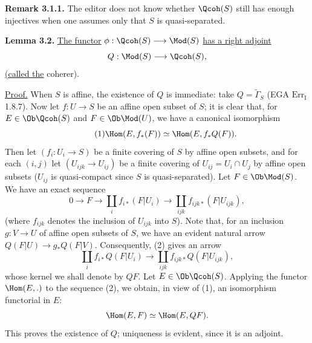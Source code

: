 \textbf{Remark 3.1.1.} The editor does not know whether $\Qcoh(S)$ still has enough injectives when one assumes only that $S$ is quasi-separated.

\textbf{Lemma 3.2.} \uline{The functor} $\phi:\Qcoh(S)\longrightarrow\Mod(S)$ \uline{has a right adjoint}
\[
 Q:\Mod(S)\longrightarrow\Qcoh(S),
\]
\uline{(called the} coherer).

\uline{Proof.} When $S$ is affine, the existence of $Q$ is immediate: take $Q=\widetilde{\Gamma}_S$ (EGA $\mathrm{Err}_{\mathrm I}$ 1.8.7). Now let $f:U\longrightarrow S$ be an affine open subset of $S$; it is clear that, for $E\in\Ob\Qcoh(S)$ and $F\in\Ob\Mod(U)$, we have a canonical isomorphism
\begin{equation}\tag{1}
 \Hom(E,f_*(F))\simeq \Hom(E,f_*Q(F)).
\end{equation}
Then let $(f_i:U_i\longrightarrow S)$ be a finite covering of $S$ by affine open subsets, and for each $(i,j)$ let $(U_{ijk}\longrightarrow U_{ij})$ be a finite covering of $U_{ij}=U_i\cap U_j$ by affine open subsets ($U_{ij}$ is quasi-compact since $S$ is quasi-separated). Let $F\in\Ob\Mod(S)$. We have an exact sequence
\begin{equation}\tag{2}
 0\longrightarrow F\longrightarrow \coprod_i f_{i*}(F|U_i)
 \longrightarrow \coprod_{ijk}f_{ijk*}(F|U_{ijk}),
\end{equation}
(where $f_{ijk}$ denotes the inclusion of $U_{ijk}$ into $S$). Note that, for an inclusion $g:V\longrightarrow U$ of affine open subsets of $S$, we have an evident natural arrow $Q(F|U)\longrightarrow g_*Q(F|V)$. Consequently, (2) gives an arrow
\begin{equation}\tag{3}
 \coprod_i f_{i*}Q(F|U_i)\longrightarrow
 \coprod_{ijk}f_{ijk*}Q(F|U_{ijk}),
\end{equation}
whose kernel we shall denote by $QF$. Let $E\in\Ob\Qcoh(S)$. Applying the functor $\Hom(E,.)$ to the sequence (2), we obtain, in view of (1), an
%
isomorphism functorial in $E$:
\[
 \Hom(E,F)\simeq\Hom(E,QF).
\]
This proves the existence of $Q$; uniqueness is evident, since it is an adjoint.

